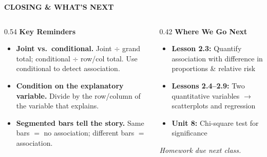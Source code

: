 \documentclass[aspectratio=169, 11pt]{beamer}
\begin{document}
{
\begin{frame}[t, plain]
  \vspace{0.45cm}\par
  \hspace{0.55cm}%
  \begin{minipage}{0.9\textwidth}
    {\color{goldacc}\bfseries\footnotesize\MakeUppercase{Closing \& What's Next}}
    \vspace{0.45cm}\par
    \begin{columns}[T]
      \begin{column}{0.54\textwidth}
        \small
        {\color{goldacc}\bfseries Key Reminders}\\[5pt]
        \begin{itemize}
          \setlength{\itemsep}{0.4em}
          \item {\color{white}\textbf{Joint vs.\ conditional.}
            {\color{skymid} Joint $\div$ grand total; conditional $\div$ row/col total.
            Use conditional to detect association.}}
          \item {\color{white}\textbf{Condition on the explanatory variable.}
            {\color{skymid} Divide by the row/column of the variable that explains.}}
          \item {\color{white}\textbf{Segmented bars tell the story.}
            {\color{skymid} Same bars $=$ no association; different bars $=$ association.}}
        \end{itemize}
      \end{column}
      \begin{column}{0.42\textwidth}
        \small
        {\color{goldacc}\bfseries Where We Go Next}\\[5pt]
        \begin{itemize}
          \setlength{\itemsep}{0.35em}
          \item {\color{white}\textbf{Lesson 2.3:} Quantify association with
            difference in proportions \& relative risk}
          \item {\color{white}\textbf{Lessons 2.4--2.9:} Two quantitative variables
            $\to$ scatterplots and regression}
          \item {\color{white}\textbf{Unit 8:} Chi-square test for significance}
        \end{itemize}
        \vspace{0.5cm}
        {\color{skymid}\itshape\small Homework due next class.}
      \end{column}
    \end{columns}
  \end{minipage}
\end{frame}
}
\end{document}
